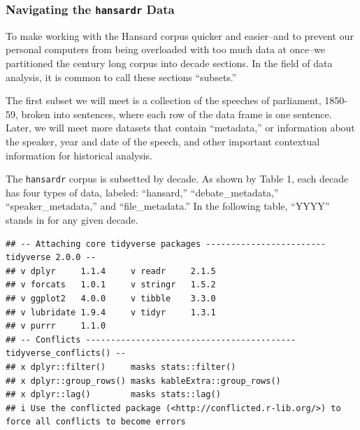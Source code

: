 \documentclass[
]{article}
\begin{document}
\subsubsection{\texorpdfstring{Navigating the \texttt{hansardr}
Data}{Navigating the hansardr Data}}\label{navigating-the-hansardr-data}

To make working with the Hansard corpus quicker and easier--and to
prevent our personal computers from being overloaded with too much data
at once--we partitioned the century long corpus into decade sections. In
the field of data analysis, it is common to call these sections
``subsets.''

The first subset we will meet is a collection of the speeches of
parliament, 1850-59, broken into sentences, where each row of the data
frame is one sentence. Later, we will meet more datasets that contain
``metadata,'' or information about the speaker, year and date of the
speech, and other important contextual information for historical
analysis.

The \texttt{hansardr} corpus is subsetted by decade. As shown by Table
1, each decade has four types of data, labeled: ``hansard,''
``debate\_metadata,'' ``speaker\_metadata,'' and ``file\_metadata.'' In
the following table, ``YYYY'' stands in for any given decade.

\begin{verbatim}
## -- Attaching core tidyverse packages ------------------------ tidyverse 2.0.0 --
## v dplyr     1.1.4     v readr     2.1.5
## v forcats   1.0.1     v stringr   1.5.2
## v ggplot2   4.0.0     v tibble    3.3.0
## v lubridate 1.9.4     v tidyr     1.3.1
## v purrr     1.1.0     
## -- Conflicts ------------------------------------------ tidyverse_conflicts() --
## x dplyr::filter()     masks stats::filter()
## x dplyr::group_rows() masks kableExtra::group_rows()
## x dplyr::lag()        masks stats::lag()
## i Use the conflicted package (<http://conflicted.r-lib.org/>) to force all conflicts to become errors
\end{verbatim}
\end{document}
